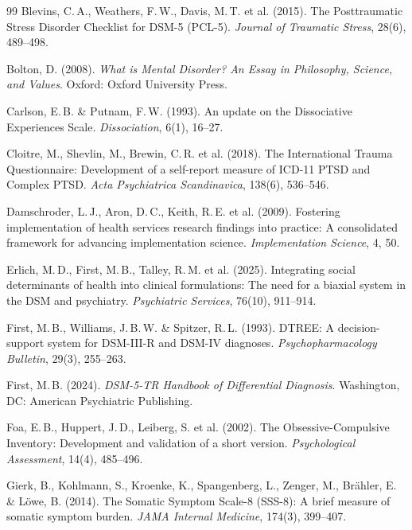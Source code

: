 \documentclass[11pt,a4paper]{article}
\begin{document}
\begin{thebibliography}{99}
Blevins, C.\,A., Weathers, F.\,W., Davis, M.\,T. et al. (2015).
\newblock The Posttraumatic Stress Disorder Checklist for DSM-5 (PCL-5).
\newblock \textit{Journal of Traumatic Stress}, 28(6), 489--498.

Bolton, D. (2008).
\newblock \textit{What is Mental Disorder? An Essay in Philosophy, Science, and Values}.
\newblock Oxford: Oxford University Press.

Carlson, E.\,B. \& Putnam, F.\,W. (1993).
\newblock An update on the Dissociative Experiences Scale.
\newblock \textit{Dissociation}, 6(1), 16--27.

Cloitre, M., Shevlin, M., Brewin, C.\,R. et al. (2018).
\newblock The International Trauma Questionnaire: Development of a self-report measure of ICD-11 PTSD and Complex PTSD.
\newblock \textit{Acta Psychiatrica Scandinavica}, 138(6), 536--546.

Damschroder, L.\,J., Aron, D.\,C., Keith, R.\,E. et al. (2009).
\newblock Fostering implementation of health services research findings into practice: A consolidated framework for advancing implementation science.
\newblock \textit{Implementation Science}, 4, 50.

Erlich, M.\,D., First, M.\,B., Talley, R.\,M. et al. (2025).
\newblock Integrating social determinants of health into clinical formulations: The need for a biaxial system in the DSM and psychiatry.
\newblock \textit{Psychiatric Services}, 76(10), 911--914.

First, M.\,B., Williams, J.\,B.\,W. \& Spitzer, R.\,L. (1993).
\newblock DTREE: A decision-support system for DSM-III-R and DSM-IV diagnoses.
\newblock \textit{Psychopharmacology Bulletin}, 29(3), 255--263.

First, M.\,B. (2024).
\newblock \textit{DSM-5-TR Handbook of Differential Diagnosis}.
\newblock Washington, DC: American Psychiatric Publishing.

Foa, E.\,B., Huppert, J.\,D., Leiberg, S. et al. (2002).
\newblock The Obsessive-Compulsive Inventory: Development and validation of a short version.
\newblock \textit{Psychological Assessment}, 14(4), 485--496.

Gierk, B., Kohlmann, S., Kroenke, K., Spangenberg, L., Zenger, M., Br\"ahler, E. \& L\"owe, B. (2014).
\newblock The Somatic Symptom Scale-8 (SSS-8): A brief measure of somatic symptom burden.
\newblock \textit{JAMA Internal Medicine}, 174(3), 399--407.


\end{thebibliography}
\end{document}
